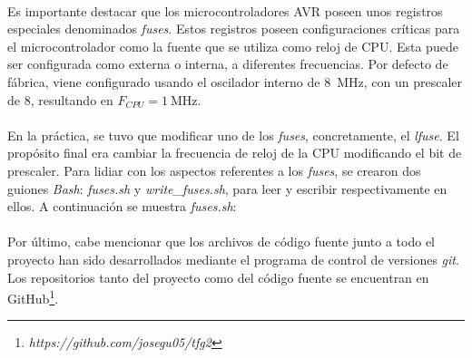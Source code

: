 

\paragraph{}
Es importante destacar que los microcontroladores AVR poseen unos registros especiales denominados \textit{fuses}.
Estos registros poseen configuraciones cr\'iticas para el microcontrolador como la fuente que se utiliza como reloj de CPU. Esta puede ser configurada como externa o interna, a diferentes frecuencias. Por defecto de fábrica, viene configurado usando el oscilador interno de \SI{8}{\mega\hertz}, con un prescaler de 8, resultando en $F_{CPU} = \SI{1}{\mega\hertz}$.
\paragraph{}
En la pr\'actica, se tuvo que modificar uno de los \textit{fuses}, concretamente, el \textit{lfuse}. El prop\'osito final era cambiar la frecuencia de reloj de la CPU modificando el bit de prescaler.
Para lidiar con los aspectos referentes a los \textit{fuses}, se crearon dos guiones \textit{Bash}: \textit{fuses.sh} y \textit{write\_fuses.sh}, para leer y escribir respectivamente en ellos. A continuaci\'on se muestra \textit{fuses.sh}:


\paragraph{}
Por último, cabe mencionar que los archivos de código fuente junto a todo el proyecto han sido desarrollados mediante el programa de control de versiones \textit{git}. 
Los repositorios tanto del proyecto como del código fuente se encuentran en GitHub\footnote{\textit{https://github.com/josegu05/tfg2}}.

